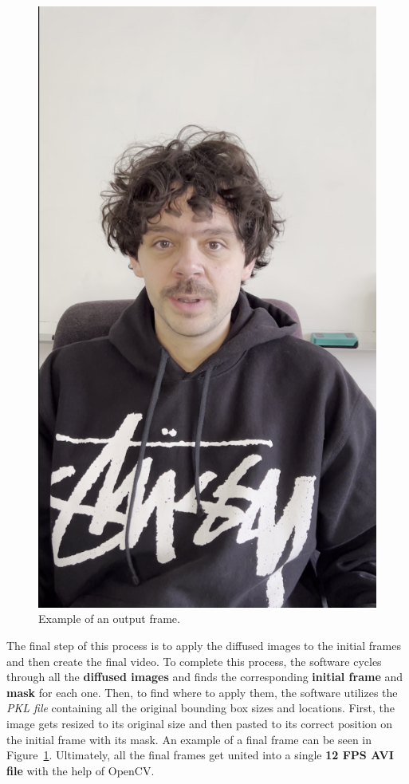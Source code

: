 \documentclass[preprint]{elsarticle}
\begin{document}
\begin{figure}[H]
	\centering
	\includegraphics[scale=0.2, keepaspectratio]{img/project_img/output.png}
	\caption{Example of an output frame.}
	\label{fig:output}
\end{figure}
The final step of this process is to apply the diffused images to the initial frames 
and then create the final video. 
To complete this process, the software cycles through all the \textbf{diffused images} 
and finds the corresponding \textbf{initial frame} and \textbf{mask} for each one. 
Then, to find where to apply them, the software utilizes the \emph{PKL file} 
containing all the original bounding box sizes and locations. 
First, the image gets resized to its original size and then pasted 
to its correct position on the initial frame with its mask. 
An example of a final frame can be seen in Figure~\ref{fig:output}.
Ultimately, all the final frames get united into a single \textbf{12 FPS AVI file} with the help of OpenCV.
\end{document}

